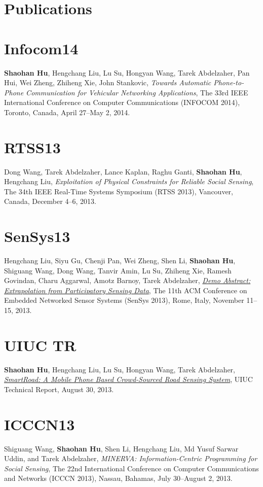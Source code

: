 \section{\sc Publications}

\section{\sc Infocom14}\hypertarget{hu2014infocom}{}
\textbf{Shaohan Hu}, Hengchang Liu, Lu Su, Hongyan Wang, Tarek
Abdelzaher, Pan Hui, Wei Zheng, Zhiheng Xie, John Stankovic,
\emph{Towards Automatic Phone-to-Phone Communication for Vehicular
  Networking Applications}, \textsf{The 33rd IEEE International Conference on Computer Communications (INFOCOM 2014)}, Toronto, Canada, April 27--May 2, 2014.

\section{\sc RTSS13}\hypertarget{wang2013rtss}{}
Dong Wang, Tarek Abdelzaher, Lance Kaplan, Raghu Ganti,
\textbf{Shaohan Hu}, Hengchang Liu, \emph{Exploitation of Physical
  Constraints for Reliable Social Sensing}, \textsf{The 34th IEEE
  Real-Time Systems Symposium (RTSS 2013)}, Vancouver, Canada,
December 4--6, 2013.

\section{\sc SenSys13}\hypertarget{liu2013sensys}{}
Hengchang Liu, Siyu Gu, Chenji Pan, Wei Zheng, Shen Li,
\textbf{Shaohan Hu}, Shiguang Wang, Dong Wang, Tanvir Amin, Lu Su,
Zhiheng Xie, Ramesh Govindan, Charu Aggarwal, Amotz Barnoy, Tarek
Abdelzaher, \href{http://portal.acm.org/citation.cfm?id=2517431}{\emph{Demo Abstract: Extrapolation from Participatory
  Sensing Data}}, \textsf{The 11th ACM Conference on Embedded Networked
  Sensor Systems (SenSys 2013)}, Rome, Italy, November 11--15, 2013.

\section{\sc UIUC TR}\hypertarget{hu2013uiuc2}{}
\textbf{Shaohan Hu}, Hengchang Liu, Lu Su, Hongyan Wang, Tarek
Abdelzaher, {\href{https://www.ideals.illinois.edu/handle/2142/45699}{\emph{SmartRoad: A Mobile Phone Based Crowd-Sourced Road
  Sensing System}}}, \textsf{UIUC Technical Report}, August 30, 2013.

\section{\sc ICCCN13}\hypertarget{wang2013icccn}{}
Shiguang Wang, \textbf{Shaohan Hu}, Shen Li, Hengchang Liu, Md Yusuf
Sarwar Uddin, and Tarek Abdelzaher, \emph{MINERVA: Information-Centric
  Programming for Social Sensing}, \textsf{The 22nd International
  Conference on Computer Communications and Networks (ICCCN 2013)},
Nassau, Bahamas, July 30--August 2, 2013.

